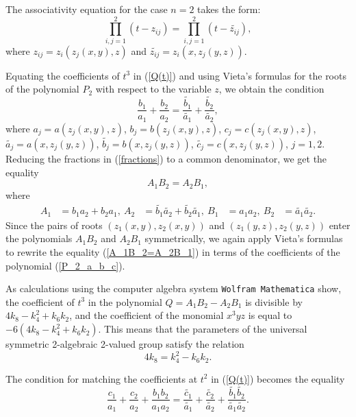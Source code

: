 \documentclass[14pt, dvipsnames]{extarticle}
\theoremstyle{definition}
\theoremstyle{definition}
\theoremstyle{remark}
\begin{document}
The associativity equation for the case $n = 2$ takes the form:
\begin{equation}\label{Q(t)}
\prod\limits_{i,j = 1}^2 (t - z_{ij}) = \prod\limits_{i, j =1}^2 (t - \widetilde{z_{ij}}),
\end{equation}
where $z_{ij} = z_i(z_j(x, y), z)$ and $\widetilde{z_{ij}} = z_i(x, z_j(y ,z))$.

Equating the coefficients of $t^3$ in (\ref{Q(t)}) and using Vieta’s formulas for the roots of the polynomial $P_2$ with respect to the variable $z$, we obtain the condition
\begin{equation}\label{fractions}
\frac{b_1}{a_1} + \frac{b_2}{a_2} = \frac{\widetilde{b_1}}{\widetilde{a_1}} + \frac{\widetilde{b_2}}{\widetilde{a_2}},
\end{equation}
where $a_j = a(z_j(x, y), z)$, $b_j = b(z_j(x, y), z)$, $c_j = c(z_j(x, y), z)$, $\widetilde{a_j} = a(x, z_j(y, z))$, $\widetilde{b_j} = b(x, z_j(y, z))$, $\widetilde{c_j} = c(x, z_j(y, z))$, $j = 1, 2$. Reducing the fractions in (\ref{fractions}) to a common denominator, we get the equality
\begin{equation}\label{A_1B_2=A_2B_1}
A_1B_2 = A_2B_1,
\end{equation}
where
$$
\begin{aligned}
A_1 &= b_1a_2 + b_2a_1, \
A_2 &= \widetilde{b_1}\widetilde{a_2} + \widetilde{b_2}\widetilde{a_1},  \
B_1 &= a_1a_2, \
B_2 &= \widetilde{a_1}\widetilde{a_2}.
\end{aligned}
$$
Since the pairs of roots $(z_1(x, y), z_2(x, y))$ and $(z_1(y, z), z_2(y, z))$ enter the polynomials $A_1B_2$ and $A_2B_1$ symmetrically, we again apply Vieta’s formulas to rewrite the equality (\ref{A_1B_2=A_2B_1}) in terms of the coefficients of the polynomial (\ref{P_2_a_b_c}).

As calculations using the computer algebra system {\tt Wolfram Mathematica} show, the coefficient of $t^3$ in the polynomial $Q = A_1B_2 - A_2B_1$ is divisible by $4k_8 - k_4^2 + k_6k_2$, and the coefficient of the monomial $x^3yz$ is equal to $-6(4k_8 - k_4^2 + k_6k_2)$. This means that the parameters of the universal symmetric 2-algebraic 2-valued group satisfy the relation
\begin{equation}\label{f^2-gd=0}
4k_8 = k_4^2 - k_6k_2.
\end{equation}

The condition for matching the coefficients at $t^2$ in (\ref{Q(t)}) becomes the equality
\begin{equation}
\frac{c_1}{a_1} + \frac{c_2}{a_2} + \frac{b_1b_2}{a_1a_2} = \frac{\widetilde{c_1}}{\widetilde{a_1}} + \frac{\widetilde{c_2}}{\widetilde{a_2}} + \frac{\widetilde{b_1}\widetilde{b_2}}{\widetilde{a_1}\widetilde{a_2}}.
\end{equation}
\end{document}
